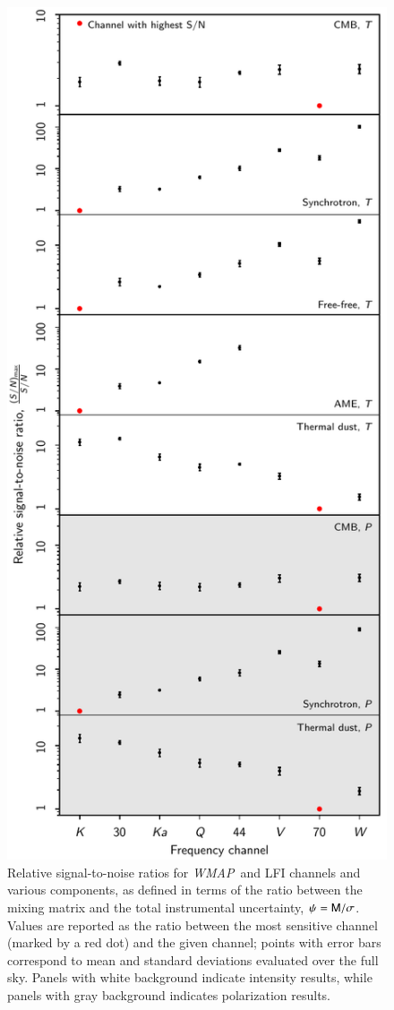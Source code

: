 \documentclass[twocolumn]{../../common/aa}
\def\WMAP{\emph{WMAP}}
\newcommand{\M}[0]{\tens{M}}
\begin{document}
\begin{figure}
  \center	
  \includegraphics[width=\linewidth]{figures/fg_s2n_v1.pdf}
  \caption{Relative signal-to-noise ratios for \WMAP\ and LFI channels and various components, as defined in terms of the ratio between the mixing matrix and the total instrumental uncertainty, $\psi = \M/\sigma$. Values are reported as the ratio between the most sensitive channel (marked by a red dot) and the given channel; points with error bars correspond to mean and standard deviations evaluated over the full sky. Panels with white background indicate intensity results, while panels with gray background indicates polarization results.}
  \label{fig:fg_s2n}
\end{figure}
\end{document}
